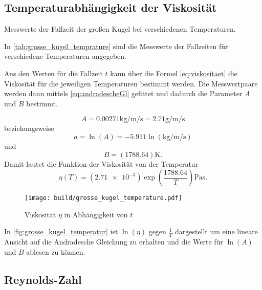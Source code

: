 \subsection{Temperaturabhängigkeit der Viskosität}

\begin{table}
  \centering
  
  \caption{Messwerte der Fallzeit der großen Kugel bei verschiedenen Temperaturen.}
  \label{tab:grosse_kugel_temprature}
\end{table}

\noindent In \autoref{tab:grosse_kugel_temprature} sind die Messwerte der Fallzeiten für verschiedene Temperaturen angegeben.


\noindent Aus den Werten für die Fallzeit $t$ kann über die Formel \eqref{eq:viskositaet} die Viskosität für die jeweiligen Temperaturen bestimmt werden.
Die Messwertpaare werden dann mittels \autoref{eq:andradescheGl} gefittet und dadurch die Parameter $A$ und $B$ bestimmt.

\begin{equation*}
  A = \num{0.00271}\si{\kilo\gram\per\meter\per\second} = \num{2.71}\si{\gram\per\meter\per\second}
\end{equation*}
beziehungsweise
\begin{equation*}
  a = \ln(A) = \num{-5.911}\ln(\si{\kilo\gram\per\meter\per\second})
\end{equation*}
und
\begin{equation*}
  B = (\num{1788.64})\si{\kelvin}.
\end{equation*}
Damit lautet die Funktion der Viskosität von der Temperatur
\begin{equation*}
  \eta(T) = (\num{2.71e-3}) \exp(\frac{\num{1788.64}}{T}) \si{\pascal\second}.
\end{equation*}

\begin{figure}[H]
  \centering
  \texttt{[image: build/grosse\_kugel\_temperature.pdf]}
  \caption{Viskosität $\eta$ in Abhängigkeit von $t$}
  \label{fig:grosse_kugel_temperatur}
\end{figure}

\noindent In \autoref{fig:grosse_kugel_temperatur} ist $\ln(\eta)$ gegen $\frac{1}{T}$ dargestellt um eine lineare Ansicht auf die Andradesche Gleichung zu erhalten und die Werte für $\ln(A)$ und $B$ ablesen zu können.



\subsection{Reynolds-Zahl}


